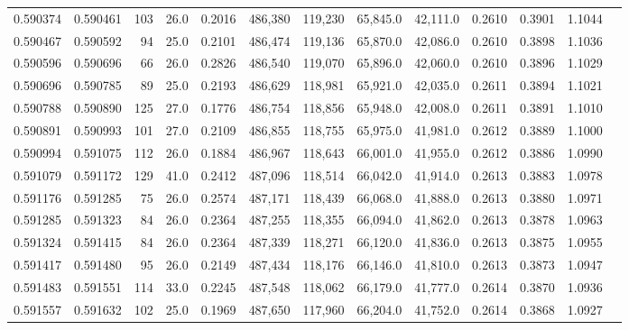 \begin{tabular}{rrrrrrrrrrrrr}
0.590374 & 0.590461 &   103 & 26.0 &                                     0.2016 & 486,380 & 119,230 &  65,845.0 &  42,111.0 & 0.2610 & 0.3901 & 1.1044 \\
0.590467 & 0.590592 &    94 & 25.0 &                                     0.2101 & 486,474 & 119,136 &  65,870.0 &  42,086.0 & 0.2610 & 0.3898 & 1.1036 \\
0.590596 & 0.590696 &    66 & 26.0 &                                     0.2826 & 486,540 & 119,070 &  65,896.0 &  42,060.0 & 0.2610 & 0.3896 & 1.1029 \\
0.590696 & 0.590785 &    89 & 25.0 &                                     0.2193 & 486,629 & 118,981 &  65,921.0 &  42,035.0 & 0.2611 & 0.3894 & 1.1021 \\
0.590788 & 0.590890 &   125 & 27.0 &                                     0.1776 & 486,754 & 118,856 &  65,948.0 &  42,008.0 & 0.2611 & 0.3891 & 1.1010 \\
0.590891 & 0.590993 &   101 & 27.0 &                                     0.2109 & 486,855 & 118,755 &  65,975.0 &  41,981.0 & 0.2612 & 0.3889 & 1.1000 \\
0.590994 & 0.591075 &   112 & 26.0 &                                     0.1884 & 486,967 & 118,643 &  66,001.0 &  41,955.0 & 0.2612 & 0.3886 & 1.0990 \\
0.591079 & 0.591172 &   129 & 41.0 &                                     0.2412 & 487,096 & 118,514 &  66,042.0 &  41,914.0 & 0.2613 & 0.3883 & 1.0978 \\
0.591176 & 0.591285 &    75 & 26.0 &                                     0.2574 & 487,171 & 118,439 &  66,068.0 &  41,888.0 & 0.2613 & 0.3880 & 1.0971 \\
0.591285 & 0.591323 &    84 & 26.0 &                                     0.2364 & 487,255 & 118,355 &  66,094.0 &  41,862.0 & 0.2613 & 0.3878 & 1.0963 \\
0.591324 & 0.591415 &    84 & 26.0 &                                     0.2364 & 487,339 & 118,271 &  66,120.0 &  41,836.0 & 0.2613 & 0.3875 & 1.0955 \\
0.591417 & 0.591480 &    95 & 26.0 &                                     0.2149 & 487,434 & 118,176 &  66,146.0 &  41,810.0 & 0.2613 & 0.3873 & 1.0947 \\
0.591483 & 0.591551 &   114 & 33.0 &                                     0.2245 & 487,548 & 118,062 &  66,179.0 &  41,777.0 & 0.2614 & 0.3870 & 1.0936 \\
0.591557 & 0.591632 &   102 & 25.0 &                                     0.1969 & 487,650 & 117,960 &  66,204.0 &  41,752.0 & 0.2614 & 0.3868 & 1.0927 \\

\end{tabular}
